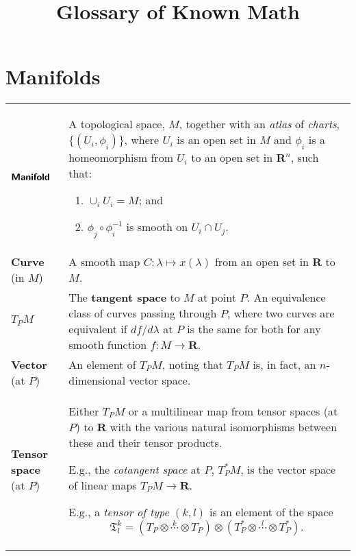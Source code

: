 \documentclass[10pt, a4paper, twocolumn]{article}
\title{Glossary of Known Math}
\date{}
\author{}
\newcommand{\defn}[1]{\textbf{\textsf{#1}}}
\newcommand{\set}[1]{\mathbold{#1}}
\newcommand{\reals}{\set{R}}
\begin{document}
\addtolength{}%
\addtolength{}%
\maketitle
\section*{Manifolds}
\begin{tabularx}{\columnwidth}{@{}p{}>{\raggedright\arraybackslash}X@{}}
  \toprule
  $\defn{Manifold}$ & A topological space, $M$, together with an \emph{atlas} of \emph{charts}, $\{(U_i, \phi_i)\}$, where $U_i$ is an open set in $M$ and $\phi_i$ is a homeomorphism from $U_i$ to an open set in $\reals^n$, such that:
  \begin{enumerate}
  \item $\cup_i U_i = M$; and
  \item $\phi_j \circ \phi_i^{-1}$ is smooth on $U_i \cap U_j$.
  \end{enumerate} \\

  \defn{Curve} (in $M$) & A smooth map $C:\lambda \mapsto x(\lambda)$ from an open set in $\reals$ to $M$. \\

  $T_P M$ & The \defn{tangent space} to $M$ at point $P$. An equivalence class of curves passing through $P$, where two curves are equivalent if $df/d\lambda$ at $P$ is the same for both for any smooth function $f:M \to \reals$. \\

  \defn{Vector} (at $P$) & An element of $T_P M$, noting that $T_P M$ is, in fact, an $n$-dimensional vector space.\\
  
  \defn{Tensor space} (at $P$) & Either $T_P M$ or a multilinear map from tensor spaces (at $P$) to $\reals$ with the various natural isomorphisms between these and their tensor products.

  E.g., the \emph{cotangent space} at $P$, $T^*_P M$, is the vector space of linear maps $T_P M\to\reals$.

  E.g., a \emph{tensor of type $(k, l)$} is an element of the space
  \begin{equation*}
    \mathfrak{T}^k_l = (T_P \otimes \overset{k}{\dotsb} \otimes T_P) \otimes (T^*_P \otimes \overset{l}{\dotsb} \otimes T^*_P).  
  \end{equation*} \\
\end{tabularx}






\printbibliography%
\end{document}
